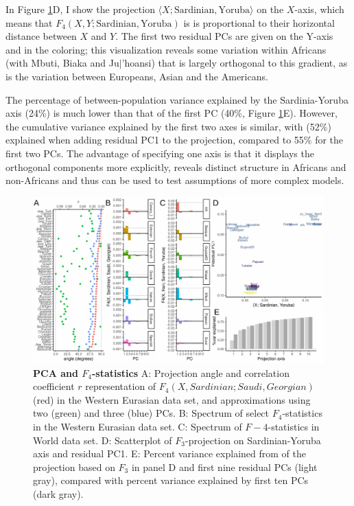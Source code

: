 \documentclass[12pt,fullpage, a4paper]{article}
\begin{document}
In Figure \ref{fig:f4}D, I show the projection $\langle X; \text{Sardinian}, \text{Yoruba} \rangle$ on the $X$-axis, which means that $F_4(X, Y; \text{Sardinian}, \text{Yoruba})$ is  is proportional to their horizontal distance between $X$ and $Y$. 
The first two residual PCs are given on the Y-axis and in the coloring; this visualization reveals some variation within Africans (with Mbuti, Biaka and Ju$\vert$'hoansi) that is largely orthogonal to this gradient, as is the variation between Europeans, Asian and the Americans. 

The percentage of between-population variance explained by the Sardinia-Yoruba axis (24\%) is much lower than that of the first PC (40\%, Figure \ref{fig:f4}E). However, the cumulative variance explained by the first two axes is similar, with (52\%) explained when adding residual PC1 to the projection, compared to 55\% for the first two PCs. The advantage of specifying one axis is that it displays the orthogonal components more explicitly, reveals distinct structure in Africans and non-Africans and thus can be used to test assumptions of more complex models.

\begin{figure}[!ht]
\includegraphics[width=\textwidth]{figures/fig_f4_data.pdf}	
	\caption{\textbf{PCA and $F_4$-statistics} A: Projection angle and correlation coefficient $r$ representation of $F_4(X, Sardinian; Saudi, Georgian)$ (red) in the Western Eurasian data set, and approximations using two (green) and three (blue) PCs.
	B: Spectrum of select $F_4$-statistics in the Western Eurasian data set.  C: Spectrum of $F-4$-statistics in World data set. D: Scatterplot of $F_3$-projection on Sardinian-Yoruba axis  and residual PC1.
	E: Percent variance explained from of the projection based on $F_3$ in panel D and first nine residual PCs (light gray), compared with percent variance explained by first ten PCs (dark gray).
	}
\label{fig:f4}
\end{figure}
\end{document}
